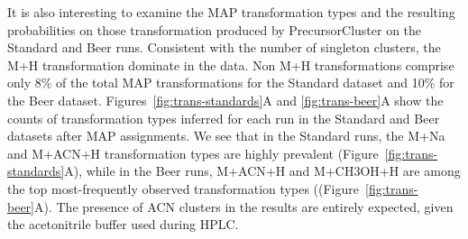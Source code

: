 
It is also interesting to examine the MAP transformation types and the resulting probabilities on those transformation produced by PrecursorCluster on the Standard and Beer runs. Consistent with the number of singleton clusters, the M+H transformation dominate in the data. Non M+H transformations comprise only 8\% of the total MAP transformations for the Standard dataset and 10\% for the Beer dataset. Figures~\ref{fig:trans-standards}A and \ref{fig:trans-beer}A show the counts of transformation types inferred for each run in the Standard and Beer datasets after MAP assignments. We see that in the Standard runs, the M+Na and M+ACN+H transformation types are highly prevalent (Figure~\ref{fig:trans-standards}A), while in the Beer runs, M+ACN+H and M+CH3OH+H are among the top most-frequently observed transformation types ((Figure~\ref{fig:trans-beer}A). The presence of ACN clusters in the results are entirely expected, given the acetonitrile buffer used during HPLC.

